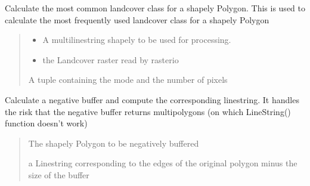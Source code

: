 \documentclass[letterpaper,10pt,english]{article}
\begin{document}

\begin{fulllineitems}
\label{\detokenize{indexes_func:indexes_func.calc_most_common_landcover_class}}
\pysigstartsignatures
{}
\pysigstopsignatures
\sphinxAtStartPar
Calculate the most common landcover class for a shapely Polygon. This is used to calculate the most frequently used landcover class for a shapely Polygon
\begin{quote}\begin{description}
\begin{itemize}
\item {} 
\sphinxAtStartPar
{} \textendash{} A multilinestring shapely to be used for processing.

\item {} 
\sphinxAtStartPar
{} \textendash{} the Landcover raster read by rasterio

\end{itemize}

\sphinxAtStartPar
A tuple containing the mode and the number of pixels

\end{description}\end{quote}

\end{fulllineitems}


\begin{fulllineitems}
\label{\detokenize{indexes_func:indexes_func.calc_neg_buf_edges}}
\pysigstartsignatures
{}
\pysigstopsignatures
\sphinxAtStartPar
Calculate a negative buffer and compute the corresponding linestring. It handles the risk that the negative buffer returns multipolygons 
(on which LineString() function doesn’t work)
\begin{quote}\begin{description}
\sphinxAtStartPar
{} \textendash{} The shapely Polygon to be negatively buffered

\sphinxAtStartPar
a Linestring corresponding to the edges of the original polygon minus the size of the buffer

\end{description}\end{quote}

\end{fulllineitems}
\end{document}

